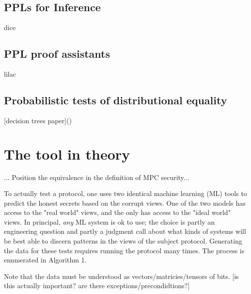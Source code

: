 \documentclass[conference]{IEEEtran}
\begin{document}
\subsection{PPLs for Inference}

dice

\subsection{PPL proof assistants}

lilac

\subsection{Probabilistic tests of distributional equality}

[decision trees paper]()

\section{The tool in theory}

... Position the equivalence in the definition of MPC security...

To actually test a protocol, one uses two identical machine learning (ML) tools to predict the honest secrets based on the corrupt views.
One of the two models has access to the "real world" views, and the only has access to the "ideal world" views.
In principal, \textit{any} ML system is ok to use; the choice is partly an engineering question
and partly a judgment call about what kinds of systems will be best able to discern patterns in the views of the subject protocol.
Generating the data for these tests requires running the protocol many times.
The process is enumerated in Algorithm 1.

Note that the data must be understood as vectors/matricies/tensors of bits. [is this actually important? are there exceptions/precondidtions?]
\end{document}
